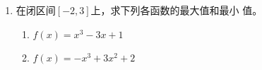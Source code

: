 \begin{enumerate}
\item 在闭区间$[-2,3]$上，求下列各函数的最大值和最小
值。
\begin{multicols}{2}
    \begin{enumerate}
        \item $f(x)=x^3-3x+1$
        \item $f(x)=-x^3+3x^2+2$
    \end{enumerate}
    \end{multicols}
\end{enumerate}